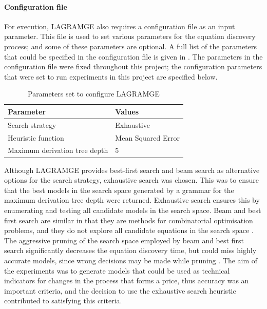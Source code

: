 \documentclass[13pt]{report}
\begin{document}
\paragraph{Configuration file} \hfill \break
For execution, LAGRAMGE also requires a configuration file as an input parameter. This file is used to set various parameters for the equation discovery process; and some of these parameters are optional. A full list of the parameters that could be specified in the configuration file is given in \cite{lagramgeman}. The parameters in the configuration file were fixed throughout this project; the configuration parameters that were set to run experiments in this project are specified below.

\begin{table}[H]
\centering

\label{my-label}
\begin{tabular}{|l|l|}
\hline
\textbf{Parameter} & \textbf{Values}    \\ \hline
Search strategy    & Exhaustive         \\ \hline
Heuristic function & Mean Squared Error \\ \hline
Maximum derivation tree depth  & 5 \\ \hline
\end{tabular}
\caption{Parameters set to configure LAGRAMGE }
\end{table}

 Although LAGRAMGE provides best-first search and beam search as alternative options for the search strategy, exhaustive search was chosen. This was to ensure that the best models in the search space generated by a grammar for the maximum derivation tree depth were returned.  Exhaustive search ensures this by enumerating and testing  all candidate models in the search space. Beam and best first search are similar in that they are methods for combinatorial optimisation problems, and they do not explore all candidate equations in the search space \cite{dashti2007pruning}. The aggressive pruning of the search space employed by beam and best first search significantly decreases the equation discovery time, but could miss highly accurate models, since wrong decisions may be made while pruning \cite{dashti2007pruning}. The aim of the experiments was to generate models that could be used as technical indicators for changes in the process that forms a price, thus accuracy was an important criteria, and the decision to use the exhaustive search heuristic contributed to satisfying this criteria.
\end{document}
